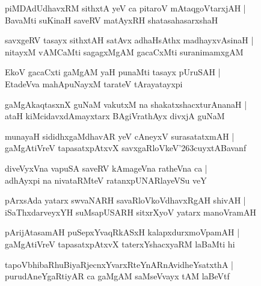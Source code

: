 \documentclass[twoside,12pt,openright]{book}
\def\S{\char'263}
\newcounter{shloka}[chapter]
\begin{document}
\begin{shloka}%
piMDAdUdhavxRM sithxtA yeV ca pitaroV mAtaqgoVtarxjAH |\\
BavaMti suKinaH saveRV matAyxRH shatasahasarxshaH 
\end{shloka}

\begin{shloka}%
savxgeRV tasayx sithxtAH satAvx adhaHsAthx madhayxvAsinaH |\\
nitayxM vAMCaMti sagagxMgAM gacaCxMti suranimamxgAM
\end{shloka}

\begin{shloka}%
EkoV gacaCxti gaMgAM yaH punaMti tasayx pUruSAH |\\
EtadeVva mahApuNayxM tarateV tArayatayxpi
\end{shloka}

\begin{shloka}%
gaMgAkaqtasxnX guNaM vakutxM na shakatxshacxturAnanaH |\\
ataH kiMcidavxdAmayxtarx BAgiVrathAyx divxjA guNaM 
\end{shloka}

\begin{shloka}%
munayaH sididhxgaMdhavAR yeV cAneyxV surasatatxmAH |\\
gaMgAtiVreV tapasatxpAtxvX savxgaRloVkeV\S cuyxtABavanf
\end{shloka}

\begin{shloka}%
diveVyxVna vapuSA saveRV kAmageVna ratheVna ca |\\
adhAyxpi na nivataRMteV ratanxpUNARlayeVSu veY
\end{shloka}

\begin{shloka}%
pArxsAda yatarx swvaNARH savaRloVkoVdhavxRgAH shivAH |\\
iSaThxdarveyxYH suMsapUSARH sitxrXyoV yatarx manoVramAH 
\end{shloka}

\begin{shloka}%
pArijAtasamAH puSepxYvaqRkASxH kalapxdurxmoVpamAH |\\
gaMgAtiVreV tapasatxpAtxvX taterxYshacxyaRM laBaMti hi 
\end{shloka}

\begin{shloka}%
tapoVbhibaRhuBiyaRjecnxYvarxRteYnARnAvidheYsatxthA |\\
purudAneYgaRtiyAR ca gaMgAM saMseVvayx tAM laBeVtf
\end{shloka}
\end{document}
